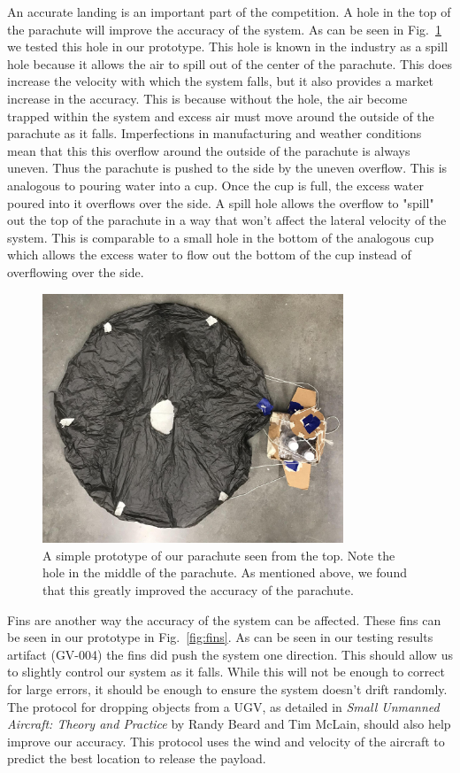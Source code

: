 \documentclass[]{auvsi_doc}
\begin{document}
An accurate landing is an important part of the competition. A hole in the top of the parachute will improve the accuracy of the system. As can be seen in Fig.~\ref{fig:top} we tested this hole in our prototype. This hole is known in the industry as a spill hole because it allows the air to spill out of the center of the parachute. This does increase the velocity with which the system falls, but it also provides a market increase in the accuracy. This is because without the hole, the air become trapped within the system and excess air must move around the outside of the parachute as it falls. Imperfections in manufacturing and weather conditions mean that this this overflow around the outside of the  parachute is always uneven. Thus the parachute is pushed to the side by the uneven overflow. This is analogous to pouring water into a cup. Once the cup is full, the excess water poured into it overflows over the side. A spill hole allows the overflow to "spill" out the top of the parachute in a way that won't affect the lateral velocity of the system. This is comparable to a small hole in the bottom of the analogous cup which allows the excess water to flow out the bottom of the cup instead of overflowing over the side. 

\begin{figure}[ht]
\centering
\includegraphics[width=90mm]{./figs/Parachute_Top.jpg}
\caption{A simple prototype of our parachute seen from the top. Note the hole in the middle of the parachute. As mentioned above, we found that this greatly improved the accuracy of the parachute.}
\label{fig:top}
\end{figure}

Fins are another way the accuracy of the system can be affected. These fins can be seen in our prototype in Fig.~\ref{fig:fins}. As can be seen in our testing results artifact (GV-004) the fins did push the system one direction. This should allow us to slightly control our system as it falls. While this will not be enough to correct for large errors, it should be enough to ensure the system doesn't drift randomly. The protocol for dropping objects from a UGV, as detailed in \textit{Small Unmanned Aircraft: Theory and Practice} by Randy Beard and Tim McLain, should also help improve our accuracy. This protocol uses the wind and velocity of the aircraft to predict the best location to release the payload.
\end{document}
